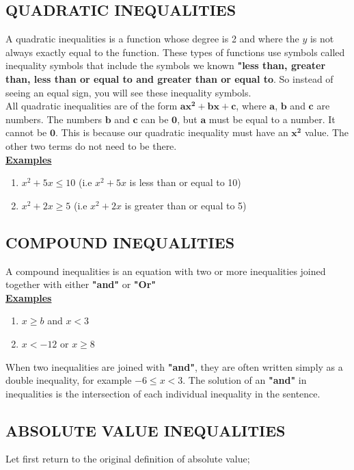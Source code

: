 \documentclass[12pt]{report}
\newcommand{\bt}[1]{\textbf{#1}}
\newcommand{\ubt}[1]{\textbf{\underline{#1}}}
\newcommand{\NI}{\noindent}
\begin{document}
	\subsection{QUADRATIC INEQUALITIES}
	A quadratic inequalities is a function whose degree is 2 and where the $y$ is not always exactly equal to the function. These types of functions use symbols called inequality symbols that include the symbols we known \bt{"less than, greater than, less than or equal to and greater than or equal to}. So instead of seeing an equal sign, you will see these inequality symbols.\\
		
	\NI All quadratic inequalities are of the form $\mathbf{ax^2 + bx + c}$, where $\mathbf{a}$, $\mathbf{b}$ and $\mathbf{c}$ are numbers. The numbers $\mathbf{b}$ and $\mathbf{c}$ can be $\mathbf{0}$, but $\mathbf{a}$ must be equal to a number. It cannot be $\mathbf{0}$. This is because our quadratic inequality must have an $\mathbf{x^2}$ value. The other two terms do not need to be there.\\
		
	\NI\ubt{Examples}
	\begin{enumerate}
		\item $x^2 + 5x \leq 10$ (i.e $x^2 + 5x$ is less than or equal to 10)
			
		\item $x^2 + 2x \geq 5$ (i.e $x^2 + 2x$ is greater than or equal to 5)
	\end{enumerate}
	
	\subsection{COMPOUND INEQUALITIES}
	A compound inequalities is an equation with two or more inequalities joined together with either \bt{"and"} or \bt{"Or"}\\
		
	\NI\ubt{Examples}
	\begin{enumerate}
		\item $x \geq b$ and $x < 3$
		\item $x < -12$ or $x \geq 8$
	\end{enumerate}
		
	When two inequalities are joined with \bt{"and"}, they are often written simply as a double inequality, for example $-6 \leq x < 3$. The solution of an \bt{"and"} in inequalities is the intersection of each individual inequality in the sentence.
		
	\subsection{ABSOLUTE VALUE INEQUALITIES}
	Let first return to the original definition of absolute value;\\
	
\end{document}
